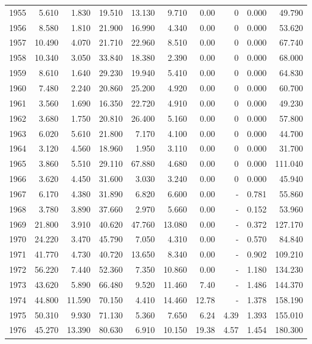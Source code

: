 \documentclass[
]{scrartcl}
\begin{document}
\begin{longtable}{rrrrrrrrrr}
1955 & 5.610 & 1.830 & 19.510 & 13.130 & 9.710 & 0.00 & 0 & 0.000 & 49.790 \\ 
1956 & 8.580 & 1.810 & 21.900 & 16.990 & 4.340 & 0.00 & 0 & 0.000 & 53.620 \\ 
1957 & 10.490 & 4.070 & 21.710 & 22.960 & 8.510 & 0.00 & 0 & 0.000 & 67.740 \\ 
1958 & 10.340 & 3.050 & 33.840 & 18.380 & 2.390 & 0.00 & 0 & 0.000 & 68.000 \\ 
1959 & 8.610 & 1.640 & 29.230 & 19.940 & 5.410 & 0.00 & 0 & 0.000 & 64.830 \\ 
1960 & 7.480 & 2.240 & 20.860 & 25.200 & 4.920 & 0.00 & 0 & 0.000 & 60.700 \\ 
1961 & 3.560 & 1.690 & 16.350 & 22.720 & 4.910 & 0.00 & 0 & 0.000 & 49.230 \\ 
1962 & 3.680 & 1.750 & 20.810 & 26.400 & 5.160 & 0.00 & 0 & 0.000 & 57.800 \\ 
1963 & 6.020 & 5.610 & 21.800 & 7.170 & 4.100 & 0.00 & 0 & 0.000 & 44.700 \\ 
1964 & 3.120 & 4.560 & 18.960 & 1.950 & 3.110 & 0.00 & 0 & 0.000 & 31.700 \\ 
1965 & 3.860 & 5.510 & 29.110 & 67.880 & 4.680 & 0.00 & 0 & 0.000 & 111.040 \\ 
1966 & 3.620 & 4.450 & 31.600 & 3.030 & 3.240 & 0.00 & 0 & 0.000 & 45.940 \\ 
1967 & 6.170 & 4.380 & 31.890 & 6.820 & 6.600 & 0.00 &  -  & 0.781 & 55.860 \\ 
1968 & 3.780 & 3.890 & 37.660 & 2.970 & 5.660 & 0.00 &  -  & 0.152 & 53.960 \\ 
1969 & 21.800 & 3.910 & 40.620 & 47.760 & 13.080 & 0.00 &  -  & 0.372 & 127.170 \\ 
1970 & 24.220 & 3.470 & 45.790 & 7.050 & 4.310 & 0.00 &  -  & 0.570 & 84.840 \\ 
1971 & 41.770 & 4.730 & 40.720 & 13.650 & 8.340 & 0.00 &  -  & 0.902 & 109.210 \\ 
1972 & 56.220 & 7.440 & 52.360 & 7.350 & 10.860 & 0.00 &  -  & 1.180 & 134.230 \\ 
1973 & 43.620 & 5.890 & 66.480 & 9.520 & 11.460 & 7.40 &  -  & 1.486 & 144.370 \\ 
1974 & 44.800 & 11.590 & 70.150 & 4.410 & 14.460 & 12.78 &  -  & 1.378 & 158.190 \\ 
1975 & 50.310 & 9.930 & 71.130 & 5.360 & 7.650 & 6.24 & 4.39 & 1.393 & 155.010 \\ 
1976 & 45.270 & 13.390 & 80.630 & 6.910 & 10.150 & 19.38 & 4.57 & 1.454 & 180.300 \\ 

\end{longtable}
\end{document}
